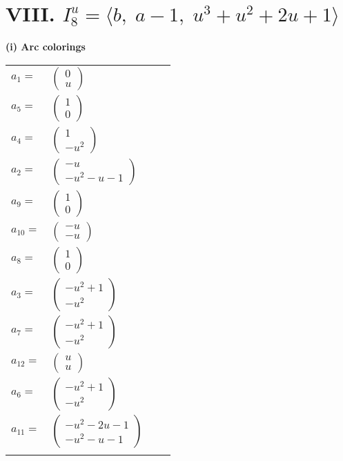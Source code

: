 \documentclass[1p]{elsarticle_modified}
\theoremstyle{definition}
\begin{document}
\centering \section*{VIII. $I^u_{8}= \langle b,\;a-1,\;u^3+u^2+2 u+1 \rangle$}
\flushleft \textbf{(i) Arc colorings}\\
\begin{tabular}{m{7pt} m{180pt} m{7pt} m{180pt} }
\flushright $a_{1}=$&$\begin{pmatrix}0\\u\end{pmatrix}$ \\
\flushright $a_{5}=$&$\begin{pmatrix}1\\0\end{pmatrix}$ \\
\flushright $a_{4}=$&$\begin{pmatrix}1\\- u^2\end{pmatrix}$ \\
\flushright $a_{2}=$&$\begin{pmatrix}- u\\- u^2- u-1\end{pmatrix}$ \\
\flushright $a_{9}=$&$\begin{pmatrix}1\\0\end{pmatrix}$ \\
\flushright $a_{10}=$&$\begin{pmatrix}- u\\- u\end{pmatrix}$ \\
\flushright $a_{8}=$&$\begin{pmatrix}1\\0\end{pmatrix}$ \\
\flushright $a_{3}=$&$\begin{pmatrix}- u^2+1\\- u^2\end{pmatrix}$ \\
\flushright $a_{7}=$&$\begin{pmatrix}- u^2+1\\- u^2\end{pmatrix}$ \\
\flushright $a_{12}=$&$\begin{pmatrix}u\\u\end{pmatrix}$ \\
\flushright $a_{6}=$&$\begin{pmatrix}- u^2+1\\- u^2\end{pmatrix}$ \\
\flushright $a_{11}=$&$\begin{pmatrix}- u^2-2 u-1\\- u^2- u-1\end{pmatrix}$\\&\end{tabular}
\end{document}
